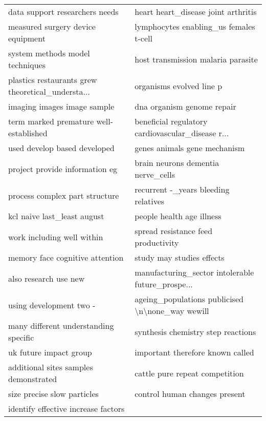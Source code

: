 \begin{tabular}{ll}
                    data support researchers needs &                heart heart\_disease joint arthritis \\
                 measured surgery device equipment &             lymphocytes enabling\_us females t-cell \\
                   system methods model techniques &                 host transmission malaria parasite \\
 plastics restaurants grew theoretical\_understa... &                           organisms evolved line p \\
                       imaging images image sample &                         dna organism genome repair \\
            term marked premature well-established &  beneficial regulatory cardiovascular\_disease r... \\
                      used develop based developed &                       genes animals gene mechanism \\
                    project provide information eg &                 brain neurons dementia nerve\_cells \\
                    process complex part structure &               recurrent -\_years bleeding relatives \\
                       kcl naive last\_least august &                          people health age illness \\
                        work including well within &                spread resistance feed productivity \\
                   memory face cognitive attention &                          study may studies effects \\
                             also research use new &  manufacturing\_sector intolerable future\_prospe... \\
                           using development two - &   ageing\_populations publicised \textbackslash n\textbackslash none\_way wewill \\
             many different understanding specific &                 synthesis chemistry step reactions \\
                            uk future impact group &                   important therefore known called \\
             additional sites samples demonstrated &                     cattle pure repeat competition \\
                       size precise slow particles &                      control human changes present \\
               identify effective increase factors &                                                    \\
\bottomrule
\end{tabular}
